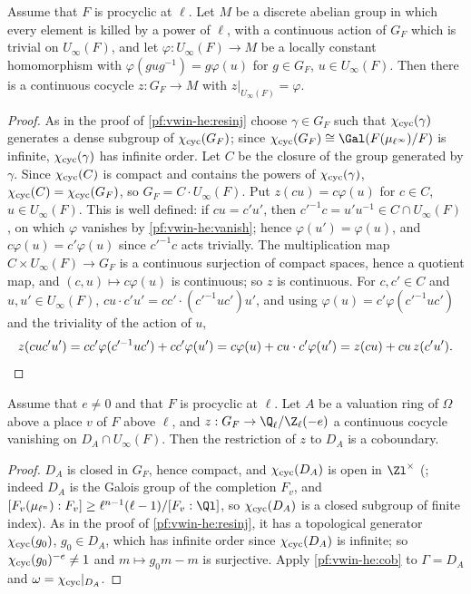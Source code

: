 \begin{lemma}\label{pf:vwin-he:ext}
Assume that $F$ is procyclic at $\ell$. Let $M$ be a discrete abelian group in which every element is killed by a
power of $\ell$, with a continuous action of $G_F$ which is trivial on $U_\infty(F)$, and let $\varphi:U_\infty(F)\to M$
be a locally constant homomorphism with $\varphi(gug^{-1})=g\varphi(u)$ for $g\in G_F$, $u\in U_\infty(F)$. Then there is
a continuous cocycle $z:G_F\to M$ with $z|_{U_\infty(F)}=\varphi$.
\end{lemma}

\begin{proof}
As in the proof of \cref{pf:vwin-he:resinj} choose $\gamma\in G_F$ such that $\chi_{\mathrm{cyc}}(\gamma)$ generates a dense
subgroup of $\chi_{\mathrm{cyc}}(G_F)$; since $\vwinhecyc(G_F)\cong\Gal(F(\mu_{\ell^\infty})/F)$ is infinite,
$\chi_{\mathrm{cyc}}(\gamma)$ has infinite order. Let $C$ be the closure of the group generated by $\gamma$. Since $\chi_{\mathrm{cyc}}(C)$
is compact and contains the powers of $\chi_{\mathrm{cyc}}(\gamma)$, $\chi_{\mathrm{cyc}}(C)=\chi_{\mathrm{cyc}}(G_F)$, so $G_F=C\cdot U_\infty(F)$.
Put $z(cu)=c\varphi(u)$ for $c\in C$, $u\in U_\infty(F)$. This is well defined: if $cu=c'u'$, then
$c'^{-1}c=u'u^{-1}\in C\cap U_\infty(F)$, on which $\varphi$ vanishes by \cref{pf:vwin-he:vanish}; hence
$\varphi(u')=\varphi(u)$, and $c\varphi(u)=c'\varphi(u)$ since $c'^{-1}c$ acts trivially. The multiplication map
$C\times U_\infty(F)\to G_F$ is a continuous surjection of compact spaces, hence a quotient map, and
$(c,u)\mapsto c\varphi(u)$ is continuous; so $z$ is continuous. For $c,c'\in C$ and $u,u'\in U_\infty(F)$,
$cu\cdot c'u'=cc'\cdot(c'^{-1}uc')u'$, and using $\varphi(u)=c'\varphi(c'^{-1}uc')$ and the triviality of the action of
$u$,
\[
 z(cuc'u')=cc'\varphi(c'^{-1}uc')+cc'\varphi(u')=c\varphi(u)+cu\cdot c'\varphi(u')=z(cu)+cu\,z(c'u').
\qedhere
\]
\end{proof}

\begin{lemma}\label{pf:vwin-he:deccob}
Assume that $e\ne0$ and that $F$ is procyclic at $\ell$. Let $A$ be a valuation ring of $\Omega$ above a place $v$ of $F$
above $\ell$, and $z:G_F\to\vwinheQZ(-e)$ a continuous cocycle vanishing on $D_A\cap U_\infty(F)$. Then the restriction
of $z$ to $D_A$ is a coboundary.
\end{lemma}

\begin{proof}
$D_A$ is closed in $G_F$, hence compact, and $\chi_{\mathrm{cyc}}(D_A)$ is open in $\Zl^\times$
(; indeed $D_A$ is the Galois group of the completion
$F_v$, and $[F_v(\mu_{\ell^n}):F_v]\ge\ell^{n-1}(\ell-1)/[F_v:\Ql]$, so $\chi_{\mathrm{cyc}}(D_A)$ is a closed subgroup of finite
index). As in the proof of \cref{pf:vwin-he:resinj}, it has a topological generator $\chi_{\mathrm{cyc}}(g_0)$, $g_0\in D_A$,
which has infinite order since $\chi_{\mathrm{cyc}}(D_A)$ is infinite; so $\chi_{\mathrm{cyc}}(g_0)^{-e}\ne1$ and $m\mapsto g_0m-m$ is
surjective. Apply \cref{pf:vwin-he:cob} to $\Gamma=D_A$ and $\omega=\chi_{\mathrm{cyc}}|_{D_A}$.
\end{proof}

